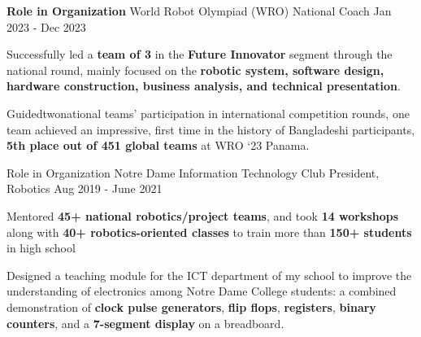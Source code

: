 

\begin{cventries}

  \cventryalt
    {\textbf{Role in Organization}} %
    {World Robot Olympiad (WRO)} %
    {National Coach} %
    {Jan 2023 - Dec 2023} %
    {
      \begin{cvitems} %
        \item {Successfully led a \textbf{team of 3} in the \textbf{Future Innovator} segment through the national round, mainly focused on the \textbf{robotic system, software design, hardware construction, business analysis, and technical presentation}.}
        \item { Guidedtwonational teams' participation in international competition rounds, one team achieved an impressive, first time in the history of Bangladeshi participants, \textbf{5th place out of 451 global teams} at WRO ‘23 Panama.}
      \end{cvitems}
    }

  \cventryalt
    {Role in Organization} %
    { Notre Dame Information Technology Club} %
    {President, Robotics} %
    {Aug 2019 - June 2021} %
    {
      \begin{cvitems} %
        \item {Mentored \textbf{45+ national robotics/project teams}, and took \textbf{14 workshops} along with \textbf{40+ robotics-oriented classes} to train more than \textbf{150+ students} in high school}
        \item { Designed a teaching module for the ICT department of my school to improve the understanding of electronics among
        Notre Dame College students: a combined demonstration of \textbf{clock pulse generators}, \textbf{flip flops}, \textbf{registers}, \textbf{binary counters},
         and a \textbf{7-segment display} on a breadboard.
       }
      \end{cvitems}
    }

\end{cventries}
